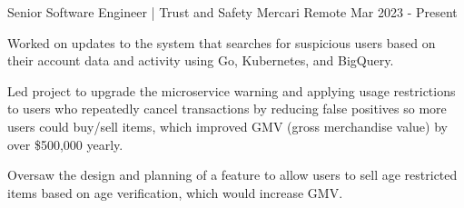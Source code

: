 

\begin{cventries}

    \cventry
    {Senior Software Engineer | Trust and Safety} %
    {Mercari} %
    {Remote} %
    {Mar 2023 - Present} %
    {
        \begin{cvitems} %
            \item {Worked on updates to the system that searches for suspicious users based on their account data and activity using Go, Kubernetes, and BigQuery.}
            \item {Led project to upgrade the microservice warning and applying usage restrictions to users who repeatedly cancel transactions by reducing false positives so more users could buy/sell items, which improved GMV (gross merchandise value) by over \$500,000 yearly.}
            \item {Oversaw the design and planning of a feature to allow users to sell age restricted items based on age verification, which would increase GMV.}
        \end{cvitems}
    }


\end{cventries}
